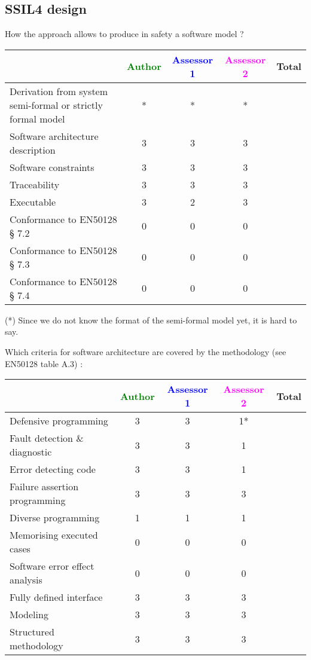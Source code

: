 \subsection{SSIL4 design}

How the approach allows to  produce in safety a software model ?

\begin{tabular}{|l | c | c | c | c|}
\hline
& \textcolor{green}{Author} & \textcolor{blue}{Assessor 1} & \textcolor{magenta}{Assessor 2} & Total \\
\hline
Derivation from system semi-formal or strictly formal model  &* &* & *&  \\
\hline 
Software architecture description  &3 &3 & 3&  \\
\hline
Software constraints  &3 &3 & 3&  \\
\hline
Traceability  &3 &3 & 3&  \\
\hline
Executable  &3 &2 & 3&  \\
\hline
Conformance to EN50128 § 7.2  &0 &0 & 0&  \\
\hline
Conformance to EN50128 § 7.3  &0 &0 & 0&  \\
\hline
Conformance to EN50128 § 7.4  &0 &0 & 0&  \\
\hline
\end{tabular}
\begin{author_comment}
(*) Since we do not know the format of the semi-formal model  yet, it is hard to say.
\end{author_comment}

Which criteria for software architecture are covered by the methodology
(see EN50128 table A.3) :

\begin{tabular}{|l | c | c | c | c|}
\hline
& \textcolor{green}{Author} & \textcolor{blue}{Assessor 1} & \textcolor{magenta}{Assessor 2} & Total \\
\hline
Defensive programming  &3 &3 & 1*&  \\
\hline 
Fault detection \& diagnostic  &3 &3 & 1&  \\
\hline
Error detecting code  &3 &3 & 1&  \\
\hline
Failure assertion programming &3 &3 & 3&  \\
\hline
Diverse programming &1 &1 & 1&  \\
\hline
Memorising executed cases &0 &0 & 0&  \\
\hline
Software error effect analysis &0 &0 & 0&  \\
\hline
Fully defined interface &3 &3 & 3&  \\
\hline
Modeling  &3 &3 & 3&  \\
\hline
Structured methodology &3 &3 & 3&  \\
\hline
\end{tabular}

